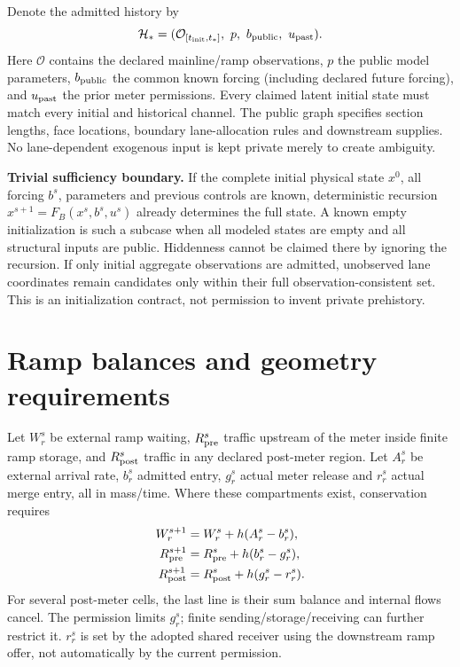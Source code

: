 \documentclass[10pt,a4paper]{article}
\begin{document}
Denote the admitted history by
\begin{equation}
\mathcal H_*=(\mathcal O_{[t_{\rm init},t_*]},\ p,\ b_{\rm public},\ u_{\rm past}).
\end{equation}
Here $\mathcal O$ contains the declared mainline/ramp observations, $p$ the
public model parameters, $b_{\rm public}$ the common known forcing (including
declared future forcing), and $u_{\rm past}$ the prior meter permissions.
Every claimed latent initial state must match every initial and historical
channel. The public graph specifies section lengths, face locations, boundary
lane-allocation rules and downstream supplies. No lane-dependent exogenous
input is kept private merely to create ambiguity.

\textbf{Trivial sufficiency boundary.} If the complete initial physical state
$x^0$, all forcing $b^s$, parameters and previous controls are known, deterministic
recursion $x^{s+1}=F_B(x^s,b^s,u^s)$ already determines the full state. A known
empty initialization is such a subcase when all modeled states are empty and
all structural inputs are public. Hiddenness cannot be claimed there by
ignoring the recursion. If only initial aggregate observations are admitted,
unobserved lane coordinates remain candidates only within their full
observation-consistent set. This is an initialization contract, not permission
to invent private prehistory.

\section{Ramp balances and geometry requirements}
Let $W_r^s$ be external ramp waiting, $R_{\rm pre}^s$ traffic upstream of the
meter inside finite ramp storage, and $R_{\rm post}^s$ traffic in any declared
post-meter region. Let $A_r^s$ be external arrival rate, $b_r^s$ admitted entry,
$g_r^s$ actual meter release and $r_r^s$ actual merge entry, all in mass/time.
Where these compartments exist, conservation requires
\begin{align}
W_r^{s+1}&=W_r^s+h(A_r^s-b_r^s),\\
R_{\rm pre}^{s+1}&=R_{\rm pre}^s+h(b_r^s-g_r^s),\\
R_{\rm post}^{s+1}&=R_{\rm post}^s+h(g_r^s-r_r^s).
\end{align}
For several post-meter cells, the last line is their sum balance and internal
flows cancel. The permission limits $g_r^s$; finite sending/storage/receiving
can further restrict it. $r_r^s$ is set by the adopted shared receiver using
the downstream ramp offer, not automatically by the current permission.
\newpage
\end{document}
